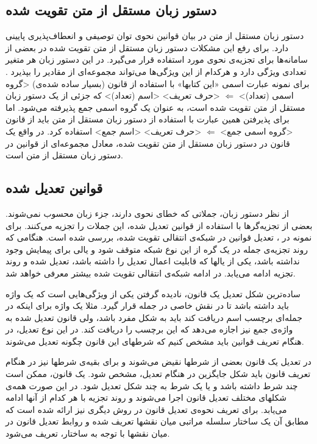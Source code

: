 \documentclass{report}
\begin{document}
\subsection{دستور زبان مستقل از متن تقویت شده}
دستور زبان مستقل از متن در بیان قوانین نحوی توان توصیفی و انعطاف‌پذیری پایینی دارد. برای رفع این مشکلات دستور زبان مستقل از متن تقویت شده‌ در بعضی از سامانه‌ها برای تجزیه‌ی نحوی مورد استفاده قرار می‌گیرد. در این دستور زبان هر متغیر تعدادی ویژگی دارد و هرکدام از این ویژگی‌ها می‌تواند مجموعه‌ای از مقادیر را بپذیرد \cite{ct4}. 
برای نمونه عبارت اسمی «این کتابها» با استفاده از قانون (بسیار ساده شده‌ی)
<گروه اسمی (تعداد)> $\Longleftarrow$ <حرف تعریف> <اسم (تعداد)>
که جزئی از یک دستور زبان مستقل از متن تقویت شده است، به عنوان یک گروه اسمی جمع پذیرفته می‌شود. اما برای پذیرفتن همین عبارت با استفاده از دستور زبان مستقل از متن باید از قانون 
<گروه اسمی جمع> $\Longleftarrow$ <حرف تعریف> <اسم جمع>
استفاده کرد. در واقع یک قانون در دستور زبان مستقل از متن تقویت شده، معادل مجموعه‌ای از قوانین در دستور زبان مستقل از متن است. 

\subsection{قوانین تعدیل شده}
از نظر دستور زبان، جملاتی که خطای نحوی دارند، جز‌ء زبان محسوب نمی‌شوند. بعضی از تجزیه‌گرها با استفاده از قوانین تعدیل شده، این جملات را تجزیه می‌کنند. برای نمونه در \cite{ct5}، تعدیل قوانین در شبکه‌ی انتقالی تقویت شده، بررسی شده است. هنگامی که روند تجزیه‌ی جمله در یک گره از این نوع شبکه متوقف شود و یالی برای پیمایش وجود نداشته باشد، یکی از یالها که قابلیت اعمال تعدیل را داشته باشد، تعدیل شده و روند تجزیه ادامه می‌یابد. در ادامه شبکه‌ی انتقالی تقویت شده بیشتر معرفی خواهد شد.

ساده‌ترین شکل تعدیل یک قانون، نادیده‌ گرفتن یکی از ویژگی‌هایی است که یک واژه باید داشته باشد تا در نقش خاصی در جمله قرار گیرد. مثلا یک واژه برای اینکه در جمله‌ای برچسب اسم دریافت کند باید به شکل مفرد باشد، ولی قانون تعدیل شده به واژ‌ه‌ی جمع نیز اجازه می‌دهد که این برچسب را دریافت کند. در این نوع تعدیل، در هنگام تعریف قوانین باید مشخص کنیم که شرطهای این قانون چگونه تعدیل می‌شوند.

در تعدیل یک قانون بعضی از شرطها نقیض می‌شوند و برای بقیه‌ی شرطها نیز در هنگام تعریف قانون باید شکل جایگزین در هنگام تعدیل، مشخص شود. یک قانون، ممکن است چند شرط داشته باشد و یا یک شرط به چند شکل تعدیل شود. در این صورت همه‌ی شکلهای مختلف تعدیل قانون اجرا می‌شوند و روند تجزیه با هر کدام از آنها ادامه می‌یابد. برای تعریف نحوه‌ی تعدیل قانون در \cite{ct5} روش دیگری نیز ارائه شده است که مطابق آن یک ساختار سلسله مراتبی میان نقشها تعریف شده و روابط تعدیل قانون در میان نقشها با توجه به ساختار، تعریف می‌شود. 
\end{document}
